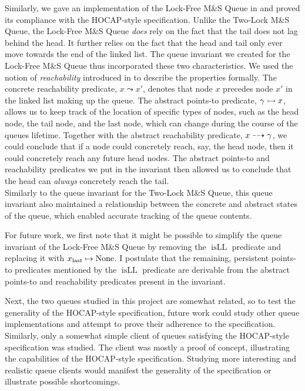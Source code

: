 \documentclass[a4paper, 10pt]{report}
\theoremstyle{definition}
\newcommand{\msq}{M\&S Queue}
\newcommand{\tlmsq}{Two-Lock \msq{}}
\newcommand{\lfmsq}{Lock-Free \msq{}}
\newcommand{\isLL}{\operatorname{isLL}}
\newcommand{\node}{x}
\newcommand{\nodeN}[1]{\node_{\mathrm{#1}}}
\newcommand{\nodelast}{\nodeN{last}}
\newcommand{\reach}[2]{#1 \leadsto #2}
\newcommand{\ar}[2]{#1 \dashrightarrow #2}
\newcommand{\ap}[2]{#1 \rightarrowtail #2}
\begin{document}
Similarly, we gave an implementation of the \lfmsq{} in \heaplang{} and proved its compliance with the HOCAP-style specification. Unlike the \tlmsq{}, the \lfmsq{} \emph{does} rely on the fact that the tail does not lag behind the head. It further relies on the fact that the head and tail only ever move towards the end of the linked list. The queue invariant we created for the \lfmsq{} thus incorporated these two characteristics. We used the notion of \textit{reachability} introduced in \citet{DBLP:conf/cpp/VindumB21} to describe the properties formally. The concrete reachability predicate, $\reach{\node}{\node'}$, denotes that node $\node$ precedes node $\node'$ in the linked list making up the queue. The abstract points-to predicate, $\ap{\gname}{\node}$, allows us to keep track of the location of specific types of nodes, such as the head node, the tail node, and the last node, which can change during the course of the queues lifetime. Together with the abstract reachability predicate, $\ar{\node}{\gname}$, we could conclude that if a node could concretely reach, say, the head node, then it could concretely reach any future head nodes. The abstract points-to and reachability predicates we put in the invariant then allowed us to conclude that the head can \emph{always} concretely reach the tail.\\
Similarly to the queue invariant for the \tlmsq{}, this queue invariant also maintained a relationship between the concrete and abstract states of the queue, which enabled accurate tracking of the queue contents.

For future work, we first note that it might be possible to simplify the queue invariant of the \lfmsq{} by removing the $\isLL$ predicate and replacing it with $\nodelast \mapsto \None$. I postulate that the remaining, persistent points-to predicates mentioned by the $\isLL$ predicate are derivable from the abstract points-to and reachability predicates present in the invariant.

Next, the two queues studied in this project are somewhat related, so to test the generality of the HOCAP-style specification, future work could study other queue implementations and attempt to prove their adherence to the specification. Similarly, only a somewhat simple client of queues satisfying the HOCAP-style specification was studied. The client was mostly a proof of concept, illustrating the capabilities of the HOCAP-style specification. Studying more interesting and realistic queue clients would manifest the generality of the specification or illustrate possible shortcomings.
\end{document}
